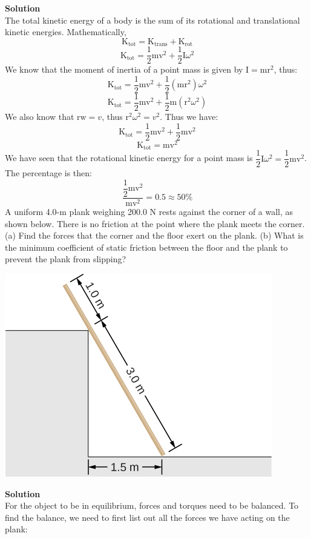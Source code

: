 \documentclass[9pt,addpoints]{exam}
\begin{document}
\begin{questions}
		\textbf{Solution} \\
		The total kinetic energy of a body is the sum of its rotational and translational kinetic energies. Mathematically,
		$$\text{K}_{\text{tot}}=\text{K}_{\text{trans}}+\text{K}_{\text{rot}}$$
		$$\text{K}_{\text{tot}}=\dfrac{1}{2}\text{mv}^2+\dfrac{1}{2}\text{I}\omega^2$$
		We know that the moment of inertia of a point mass is given by $\text{I}=\text{mr}^2$, thus:
		$$\text{K}_{\text{tot}}=\dfrac{1}{2}\text{mv}^2+\dfrac{1}{2}(\text{mr}^2)\omega^2$$ 
		$$\text{K}_{\text{tot}}=\dfrac{1}{2}\text{mv}^2+\dfrac{1}{2}\text{m}(\text{r}^2\omega^2)$$
		We also know that $\text{rw}=v$, thus $\text{r}^2\omega^2=v^2$. Thus we have:
		$$\text{K}_{\text{tot}}=\dfrac{1}{2}\text{mv}^2+\dfrac{1}{2}\text{mv}^2$$
		$$\text{K}_{\text{tot}}=\text{mv}^2$$	
		We have seen that the rotational kinetic energy for a point mass is $\dfrac{1}{2}\text{I}\omega^2=\dfrac{1}{2}\text{mv}^2$. The percentage is then:
		$$\dfrac{\dfrac{1}{2}\text{mv}^2}{\text{mv}^2}=0.5\approx50\%$$
		\question A uniform 4.0-m plank weighing 200.0 N rests against the corner of a wall, as shown below. There is no friction at the point where the plank meets the corner. (a) Find the forces that the corner and the floor exert on the plank. (b) What is the minimum coefficient of static friction between the floor and the plank to prevent the plank from slipping?
		\begin{center}
			\includegraphics[scale=0.8]{ladder.jpeg}
		\end{center} 
		\textbf{Solution} \\
		For the object to be in equilibrium, forces and torques need to be balanced. To find the balance, we need to first list out all the forces we have acting on the plank: 

\end{questions}
\end{document}
